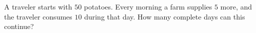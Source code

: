 A traveler starts with $50$ potatoes. Every morning a farm supplies $5$ more, and the traveler consumes $10$ during that day. How many complete days can this continue?
